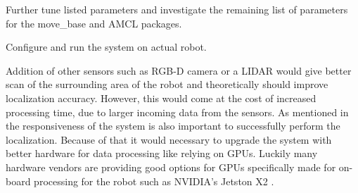 \documentclass[10pt,journal,compsoc]{IEEEtran}
\begin{document}
Further tune listed parameters and investigate the remaining list of parameters for the move\_base and AMCL packages.

Configure and run the system on actual robot.

Addition of other sensors such as RGB-D camera or a LIDAR would give better scan of the surrounding area of the robot and theoretically should improve localization accuracy. However, this would come at the cost of increased processing time, due to larger incoming data from the sensors. As mentioned in \cite{Fox99montecarlo} the responsiveness of the system is also important to successfully perform the localization. Because of that it would necessary to upgrade the system with better hardware for data processing like relying on GPUs. Luckily many hardware vendors are providing good options for GPUs specifically made  for on-board processing for the robot such as NVIDIA's Jetston X2 \cite{nvidia-jetston-x2}.



\end{document}
